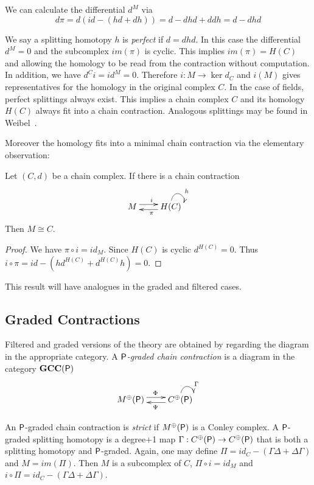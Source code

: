 We can calculate the differential $d^M$ via $$d\pi = d(id-(hd+dh)) = d-dhd + ddh = d-dhd$$


We say a splitting homotopy $h$ is {\em perfect} if $d=dhd$.  In this case the differential $d^M=0$ and the subcomplex $im(\pi)$ is cyclic.  This implies $im(\pi)=H(C)$ and allowing the homology to be read from the contraction without computation.  In addition, we have $d^Ci = id^M = 0$.  Therefore $i:M\to \ker d_C$ and $i(M)$ gives representatives for the homology in the original complex $C$. In the case of fields, perfect splittings always exist.  This implies a chain complex $C$ and its homology $H(C)$ always fit into a chain contraction.  Analogous splittings may be found in Weibel~\cite{weibel}.

Moreover the homology fits into a minimal chain contraction via the elementary observation:

\begin{prop}
Let $(C,d)$ be a chain complex.  If there is a chain contraction
\[
\xymatrixrowsep{0.03in}
\xymatrixcolsep{0.3in}
\xymatrix{
M  \ar[r]<3pt>^{i} & \ar[l]<3pt>^{\pi} H(C) \ar@(u,r)^{h}
}
\]
Then $M\cong C$.
\end{prop}
\begin{proof}
We have $\pi \circ i  = id_M$.  Since $H(C)$ is cyclic $d^{H(C)}=0$.  Thus  $i\circ\pi = id-(hd^{H(C)}+d^{H(C)}h) = 0$.
\end{proof}

This result will have analogues in the graded and filtered cases.


\subsection{Graded Contractions}

Filtered and graded versions of the theory are obtained by regarding the diagram in the appropriate category.  A {\em ${\mathsf P}$-graded chain contraction} is a diagram in the category ${\bf GCC({\mathsf P})}$
 \[
\xymatrixrowsep{0.03in}
\xymatrixcolsep{0.3in}
\xymatrix{
M^\oplus(\sP)  \ar[r]<3pt>^{\Phi} & \ar[l]<3pt>^{\Psi} C^\oplus(\sP) \ar@(u,r)^{\Gamma}
}
\]

 An ${\mathsf P}$-graded chain contraction is {\em strict} if $M^\oplus({\mathsf P})$ is a Conley complex.  A ${\mathsf P}$-graded splitting homotopy is a degree+1 map $\Gamma:C^\oplus({\mathsf P})\to C^\oplus({\mathsf P})$ that is both a splitting homotopy and ${\mathsf P}$-graded.    Again, one may define $\Pi=id_C-(\Gamma\Delta+\Delta\Gamma)$ and $M=im(\Pi)$.  Then $M$ is a subcomplex of $C$, $\Pi \circ i = id_M$ and $i\circ \Pi = id_C-(\Gamma\Delta+\Delta\Gamma)$.  
  
